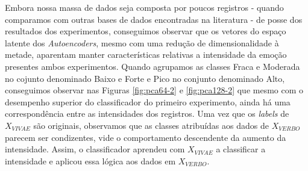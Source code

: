 Embora nossa massa de dados seja composta por poucos registros - quando comparamos com outras bases de dados encontradas na literatura - de posse dos resultados dos experimentos, conseguimos observar que os vetores do espaço latente dos \textit{Autoencoders}, mesmo com uma redução de dimensionalidade à metade, aparentam manter características relativas a intensidade da emoção presentes ambos experimentos. Quando agrupamos as classes Fraca e Moderada no cojunto denominado Baixo e Forte e Pico no conjunto denominado Alto, conseguimos observar nas Figuras \ref{fig:pca64-2} e \ref{fig:pca128-2} que mesmo com o desempenho superior do classificador do primeiro experimento, ainda há uma correspondência entre as intensidades dos registros. Uma vez que os \textit{labels} de $X_{VIVAE}$ são originais, observamos que as classes atribuídas aos dados de $X_{VERBO}$ parecem ser condizentes, vide o comportamento descendente da aumento da intensidade. Assim, o classificador aprendeu com $X_{VIVAE}$ a classificar a intensidade e aplicou essa lógica aos dados em $X_{VERBO}$.
